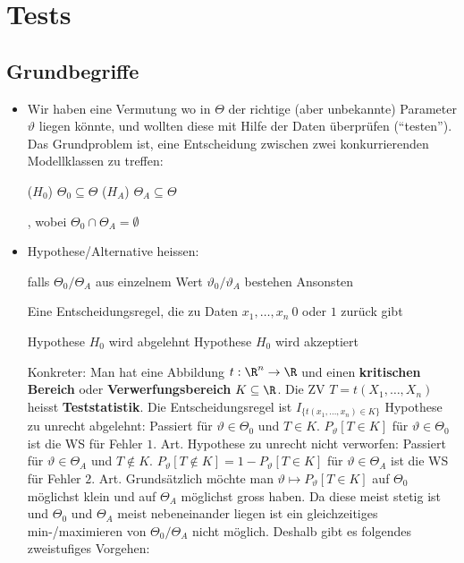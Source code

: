 
\section{Tests}
\subsection{Grundbegriffe}
\begin{itemize}
    \item Wir haben eine Vermutung wo in $\Theta$ der richtige (aber unbekannte) Parameter $\vartheta$ liegen könnte, und wollten diese mit Hilfe der Daten überprüfen (``testen''). Das Grundproblem ist, eine Entscheidung zwischen zwei konkurrierenden Modellklassen zu treffen: 
        \begin{itemize*}
             ($H_0$) $\Theta_0 \subseteq \Theta$
             ($H_A$) $\Theta_A \subseteq \Theta$
        \end{itemize*}, wobei $\Theta_0 \cap \Theta_A = \emptyset$
    \item Hypothese/Alternative heissen:
        \begin{itemize}
             falls $\Theta_0/\Theta_A$ aus einzelnem Wert $\vartheta_0/\vartheta_A$ bestehen
             Ansonsten
        \end{itemize}
     Eine Entscheidungsregel, die zu Daten $x_1, \dots, x_n \ 0$ oder $1$ zurück gibt
        \begin{itemize}
             Hypothese $H_0$ wird abgelehnt
             Hypothese $H_0$ wird akzeptiert
        \end{itemize}
        Konkreter: Man hat eine Abbildung $t: \R^n \to \R$ und einen \textbf{kritischen Bereich} oder \textbf{Verwerfungsbereich} $K \subseteq \R$. Die ZV $T = t(X_1, \dots, X_n)$ heisst \textbf{Teststatistik}. Die Entscheidungsregel ist $I_{\{t(x_1, \dots, x_n) \in K\}}$
         Hypothese zu unrecht abgelehnt: Passiert für $\vartheta \in \Theta_0$ und $T \in K$. $P_\vartheta[T \in K]$ für $\vartheta \in \Theta_0$ ist die WS für Fehler $1.$ Art.
         Hypothese zu unrecht nicht verworfen: Passiert für $\vartheta \in \Theta_A$ und $T \notin K$. $P_\vartheta[T \notin K] = 1 - P_\vartheta[T \in K]$ für $\vartheta \in \Theta_A$ ist die WS für Fehler $2.$ Art.
     Grundsätzlich möchte man $\vartheta \mapsto P_\vartheta[T \in K]$ auf $\Theta_0$ möglichst klein und auf $\Theta_A$ möglichst gross haben. Da diese meist stetig ist und $\Theta_0$ und $\Theta_A$ meist nebeneinander liegen ist ein gleichzeitiges min-/maximieren von $\Theta_0/\Theta_A$ nicht möglich. Deshalb gibt es folgendes zweistufiges Vorgehen:

\end{itemize}

